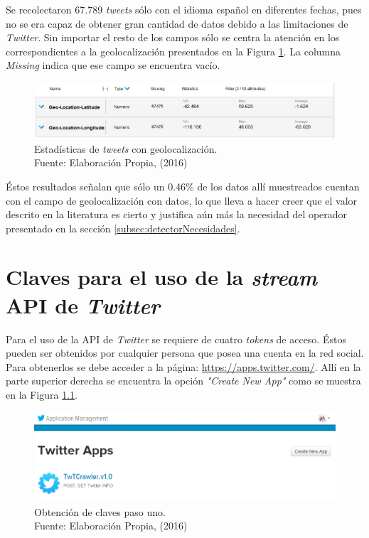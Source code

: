 Se recolectaron 67.789 \textit{tweets} sólo con el idioma español en diferentes fechas, pues no se era capaz de obtener gran cantidad de datos debido a las limitaciones de \textit{Twitter}. Sin importar el resto de los campos sólo se centra la atención en los correspondientes a la geolocalización presentados en la Figura \ref{fig:RMResult}. La columna \textit{Missing} indica que ese campo se encuentra vacío.

\begin{figure}[H]
        \centering
        \captionsetup{justification=centering}
        \includegraphics[scale=0.6]{images/ResultadoRapidMiner.png}
        \caption[Estadísticas de \textit{tweets} con geolocalización.]{Estadísticas de \textit{tweets} con geolocalización.\\Fuente: Elaboración Propia, (2016)}
        \label{fig:RMResult}
\end{figure}

Éstos resultados señalan que sólo un 0.46\% de los datos allí muestreados cuentan con el campo de geolocalización con datos, lo que lleva a hacer creer que el valor descrito en la literatura es cierto y justifica aún más la necesidad del operador presentado en la sección \ref{subsec:detectorNecesidades}.

\chapter{Claves para el uso de la \textit{stream} API de \textit{Twitter}}
\label{apendice:clavesApi}

Para el uso de la API de \textit{Twitter} se requiere de cuatro \textit{tokens} de acceso. Éstos pueden ser obtenidos por cualquier persona que posea una cuenta en la red social. Para obtenerlos se debe acceder a la página: \url{https://apps.twitter.com/}. Allí en la parte superior derecha se encuentra la opción \textit{"Create New App"} como se muestra en la Figura \ref{fig:CreateNewApp}.

\begin{figure}[H]
        \centering
        \captionsetup{justification=centering}
        \includegraphics[scale=0.6]{images/CreateNewApp.png}
        \caption[Obtención de claves paso uno.]{Obtención de claves paso uno.\\Fuente: Elaboración Propia, (2016)}
        \label{fig:CreateNewApp}
\end{figure}

